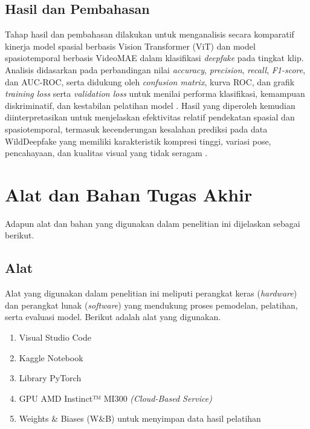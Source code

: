 \subsection{Hasil dan Pembahasan} \label{III.Hasil dan Pembahasan}
Tahap hasil dan pembahasan dilakukan untuk menganalisis secara komparatif kinerja model spasial berbasis Vision Transformer (ViT) dan model spasiotemporal berbasis VideoMAE dalam klasifikasi \textit{deepfake} pada tingkat klip. Analisis didasarkan pada perbandingan nilai \textit{accuracy}, \textit{precision}, \textit{recall}, \textit{F1-score}, dan AUC-ROC, serta didukung oleh \textit{confusion matrix}, kurva ROC, dan grafik \textit{training loss} serta \textit{validation loss} untuk menilai performa klasifikasi, kemampuan diskriminatif, dan kestabilan pelatihan model \cite{SOKOLOVA2009427}\cite{FAWCETT2006861}\cite{lu2022novelframeworkassessmentlearningbased}. Hasil yang diperoleh kemudian diinterpretasikan untuk menjelaskan efektivitas relatif pendekatan spasial dan spasiotemporal, termasuk kecenderungan kesalahan prediksi pada data WildDeepfake yang memiliki karakteristik kompresi tinggi, variasi pose, pencahayaan, dan kualitas visual yang tidak seragam \cite{Haliassos2021}\cite{Zi2024}\cite{chu2025reducedspatialdependencygeneral}. \par

\section{Alat dan Bahan Tugas Akhir} \label{III.Alat dan Bahan}
Adapun alat dan bahan yang digunakan dalam penelitian ini dijelaskan sebagai berikut. \par

\subsection{Alat} \label{III.Alat}
Alat yang digunakan dalam penelitian ini meliputi perangkat keras (\textit{hardware}) dan perangkat lunak (\textit{software}) yang mendukung proses pemodelan, pelatihan, serta evaluasi model. Berikut adalah alat yang digunakan. \par
\begin{enumerate}[noitemsep]
	\item Visual Studio Code
	\item Kaggle Notebook
	\item Library PyTorch
	\item GPU AMD Instinct™ MI300 \textit{(Cloud-Based Service)} 
	\item Weights \& Biases (W\&B) untuk menyimpan data hasil pelatihan
\end{enumerate}

